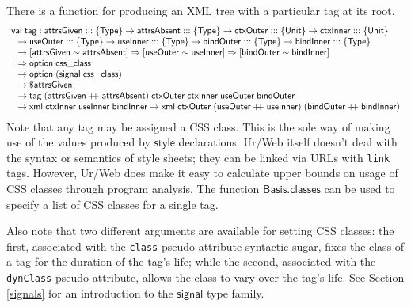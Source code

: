 \documentclass{article}
\newcommand{\mt}[1]{\mathsf{#1}}
\newcommand{\rc}{+ \hspace{-.075in} + \;}
\begin{document}
There is a function for producing an XML tree with a particular tag at its root.
$$\begin{array}{l}
  \mt{val} \; \mt{tag} : \mt{attrsGiven} ::: \{\mt{Type}\} \to \mt{attrsAbsent} ::: \{\mt{Type}\} \to \mt{ctxOuter} ::: \{\mt{Unit}\} \to \mt{ctxInner} ::: \{\mt{Unit}\} \\
  \hspace{.1in} \to \mt{useOuter} ::: \{\mt{Type}\} \to \mt{useInner} ::: \{\mt{Type}\} \to \mt{bindOuter} ::: \{\mt{Type}\} \to \mt{bindInner} ::: \{\mt{Type}\} \\
  \hspace{.1in} \to [\mt{attrsGiven} \sim \mt{attrsAbsent}] \Rightarrow [\mt{useOuter} \sim \mt{useInner}] \Rightarrow [\mt{bindOuter} \sim \mt{bindInner}] \\
  \hspace{.1in} \Rightarrow \mt{option} \; \mt{css\_class} \\
  \hspace{.1in} \to \mt{option} \; (\mt{signal} \; \mt{css\_class}) \\
  \hspace{.1in} \to \$\mt{attrsGiven} \\
  \hspace{.1in} \to \mt{tag} \; (\mt{attrsGiven} \rc \mt{attrsAbsent}) \; \mt{ctxOuter} \; \mt{ctxInner} \; \mt{useOuter} \; \mt{bindOuter} \\
  \hspace{.1in} \to \mt{xml} \; \mt{ctxInner} \; \mt{useInner} \; \mt{bindInner} \to \mt{xml} \; \mt{ctxOuter} \; (\mt{useOuter} \rc \mt{useInner}) \; (\mt{bindOuter} \rc \mt{bindInner})
\end{array}$$
Note that any tag may be assigned a CSS class.  This is the sole way of making use of the values produced by $\mt{style}$ declarations.  Ur/Web itself doesn't deal with the syntax or semantics of style sheets; they can be linked via URLs with \texttt{link} tags.  However, Ur/Web does make it easy to calculate upper bounds on usage of CSS classes through program analysis.  The function $\mt{Basis.classes}$ can be used to specify a list of CSS classes for a single tag.

Also note that two different arguments are available for setting CSS classes: the first, associated with the \texttt{class} pseudo-attribute syntactic sugar, fixes the class of a tag for the duration of the tag's life; while the second, associated with the \texttt{dynClass} pseudo-attribute, allows the class to vary over the tag's life.  See Section \ref{signals} for an introduction to the $\mt{signal}$ type family.
\end{document}
